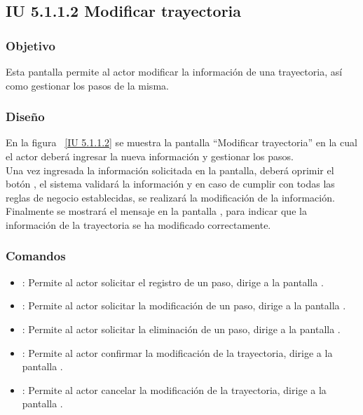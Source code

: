 \newpage 
\subsection{IU 5.1.1.2 Modificar trayectoria}

\subsubsection{Objetivo}
	
	Esta pantalla permite al actor modificar la información de una trayectoria, así como gestionar los pasos de la misma.

\subsubsection{Diseño}

    En la figura ~\ref{IU 5.1.1.2} se muestra la pantalla ``Modificar trayectoria'' en la cual el actor deberá ingresar la nueva información y gestionar los pasos.\\
      
    Una vez ingresada la información solicitada en la pantalla, deberá oprimir el botón , el sistema validará la información y en caso de cumplir con todas las reglas de negocio establecidas, se realizará la modificación de la información.\\
	    
    Finalmente se mostrará el mensaje  en la pantalla , para indicar que la información de la trayectoria se ha modificado correctamente.        


\subsubsection{Comandos}
\begin{itemize}
	\item {}: Permite al actor solicitar el registro de un paso, dirige a la pantalla .
	\item \btnEditar[Modificar]: Permite al actor solicitar la modificación de un paso, dirige a la pantalla .
	\item \btnEliminar[Eliminar]: Permite al actor solicitar la eliminación de un paso, dirige a la pantalla .
	\item {}: Permite al actor confirmar la modificación de la trayectoria, dirige a la pantalla .
	\item {}: Permite al actor cancelar la modificación de la trayectoria, dirige a la pantalla .
\end{itemize}

